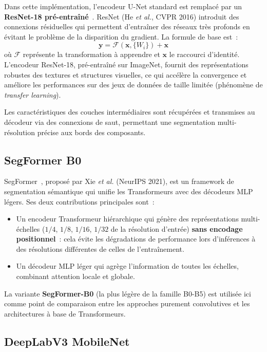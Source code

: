 \documentclass[12pt,a4paper]{report}
\begin{document}
Dans cette impl\'ementation, l'encodeur U-Net standard est remplac\'e par un \textbf{ResNet-18 pr\'e-entra\^in\'e}~\cite{he2016resnet}. ResNet (He \textit{et al.}, CVPR 2016) introduit des connexions r\'esiduelles qui permettent d'entra\^iner des r\'eseaux tr\`es profonds en \'evitant le probl\`eme de la disparition du gradient. La formule de base est~:
\[
    \mathbf{y} = \mathcal{F}(\mathbf{x}, \{W_i\}) + \mathbf{x}
\]
o\`u $\mathcal{F}$ repr\'esente la transformation \`a apprendre et $\mathbf{x}$ le raccourci d'identit\'e. L'encodeur ResNet-18, pr\'e-entra\^in\'e sur ImageNet, fournit des repr\'esentations robustes des textures et structures visuelles, ce qui acc\'el\`ere la convergence et am\'eliore les performances sur des jeux de donn\'ees de taille limit\'ee (ph\'enom\`ene de \textit{transfer learning}).

Les caract\'eristiques des couches interm\'ediaires sont r\'ecup\'er\'ees et transmises au d\'ecodeur via des connexions de saut, permettant une segmentation multi-r\'esolution pr\'ecise aux bords des composants.

\subsection{SegFormer B0}

SegFormer~\cite{xie2021segformer}, propos\'e par Xie \textit{et al.} (NeurIPS 2021), est un framework de segmentation s\'emantique qui unifie les Transformeurs avec des d\'ecodeurs MLP l\'egers. Ses deux contributions principales sont~:
\begin{itemize}
    \item Un encodeur Transformeur hi\'erarchique qui g\'en\`ere des repr\'esentations multi-\'echelles ($1/4$, $1/8$, $1/16$, $1/32$ de la r\'esolution d'entr\'ee) \textbf{sans encodage positionnel}~: cela \'evite les d\'egradations de performance lors d'inf\'erences \`a des r\'esolutions diff\'erentes de celles de l'entra\^inement.
    \item Un d\'ecodeur MLP l\'eger qui agr\`ege l'information de toutes les \'echelles, combinant attention locale et globale.
\end{itemize}

La variante \textbf{SegFormer-B0} (la plus l\'eg\`ere de la famille B0-B5) est utilis\'ee ici comme point de comparaison entre les approches purement convolutives et les architectures \`a base de Transformeurs.

\subsection{DeepLabV3 MobileNet}
\end{document}
